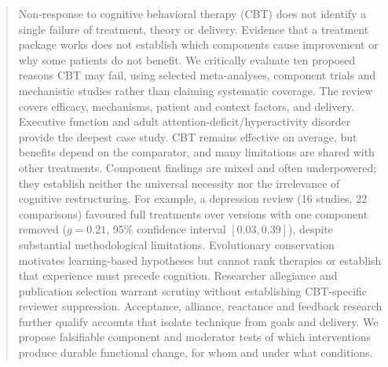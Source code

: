 \begin{abstract}
Non-response to cognitive behavioral therapy (CBT) does not identify a single failure of treatment, theory or delivery.
Evidence that a treatment package works does not establish which components cause improvement or why some patients do not benefit.
We critically evaluate ten proposed reasons CBT may fail, using selected meta-analyses, component trials and mechanistic studies rather than claiming systematic coverage.
The review covers efficacy, mechanisms, patient and context factors, and delivery.
Executive function and adult attention-deficit/hyperactivity disorder provide the deepest case study.
CBT remains effective on average, but benefits depend on the comparator, and many limitations are shared with other treatments.
Component findings are mixed and often underpowered; they establish neither the universal necessity nor the irrelevance of cognitive restructuring.
For example, a depression review (16 studies, 22 comparisons) favoured full treatments over versions with one component removed ($g=0.21$, 95\% confidence interval $[0.03,0.39]$), despite substantial methodological limitations.
Evolutionary conservation motivates learning-based hypotheses but cannot rank therapies or establish that experience must precede cognition.
Researcher allegiance and publication selection warrant scrutiny without establishing CBT-specific reviewer suppression.
Acceptance, alliance, reactance and feedback research further qualify accounts that isolate technique from goals and delivery.
We propose falsifiable component and moderator tests of which interventions produce durable functional change, for whom and under what conditions.
\end{abstract}
